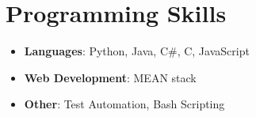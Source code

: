 \documentclass[letterpaper,11pt]{article}
\newcommand{\resumeItem}[2]{
  \item\small{
    \textbf{#1}{: #2 \vspace{-2pt}}
  }
}
\newcommand{\resumeSubHeadingListStart}{\begin{itemize}[leftmargin=*]}
\newcommand{\resumeSubHeadingListEnd}{\end{itemize}}
\newcommand{\resumeItemListStart}{\begin{itemize}[rightmargin=1in]}
\newcommand{\resumeItemListEnd}{\end{itemize}\vspace{-5pt}}
\begin{document}
\section{Programming Skills}
  \resumeSubHeadingListStart
    \item
      \textbf{Languages}{: Python, Java, C\#, C, JavaScript } 
    \item 
      \textbf{Web Development}{: MEAN stack }
      \item \textbf{Other}{: Test Automation, Bash Scripting}
  \resumeSubHeadingListEnd 
  


\end{document}
